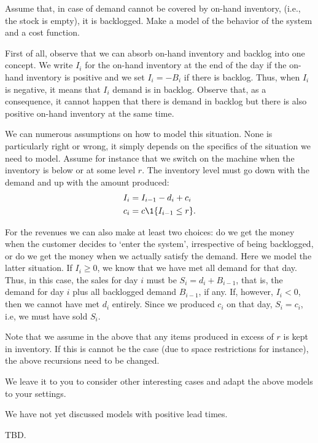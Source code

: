 \begin{question}
  Assume that, in case of demand cannot be covered by on-hand
  inventory, (i.e., the stock is empty), it is backlogged. Make a
  model of the behavior of the system and a cost function.
  \begin{solution}
    First of all, observe that we can absorb on-hand inventory and
    backlog into one concept. We write $I_i$ for the on-hand inventory
    at the end of the day if the on-hand inventory is positive and we
    set $I_i=-B_i$ if there is backlog. Thus, when $I_i$ is negative,
    it means that $I_i$ demand is in backlog.  Observe that, as a
    consequence, it cannot happen that there is demand in backlog but
    there is also positive on-hand inventory at the same time.

    We can numerous assumptions on how to model this situation. None
    is particularly right or wrong, it simply depends on the specifics
    of the situation we need to model. Assume for instance that we
    switch on the machine when the inventory is below or at some level
    $r$. The inventory level must go down with the demand and up with
    the amount produced:
    \begin{align*}
      I_i &= I_{i-1}-d_i + c_i \\
c_i &= c \1{I_{i-1} \leq r}.
    \end{align*}

    For the revenues we can also make at least two choices: do we get
    the money when the customer decides to `enter the system',
    irrespective of being backlogged, or do we get the money when we
    actually satisfy the demand. Here we model the latter situation.
    If $I_i\geq 0$, we know that we have met all demand for that
    day. Thus, in this case, the sales for day $i$ must be
    $S_i = d_i+B_{i-1}$, that is, the demand for day $i$ plus all
    backlogged demand $B_{i-1}$, if any. If, however, $I_i <0$, then
    we cannot have met $d_i$ entirely. Since we produced $c_i$ on that
    day, $S_i = c_i$, i.e, we must have sold $S_i$. 

    Note that we assume in the above that any items produced in excess
    of $r$ is kept in inventory. If this is cannot be the case (due to
    space restrictions for instance), the above recursions need to be
    changed.

    We leave it to you to consider other interesting cases and adapt
    the above models to your settings.

  \end{solution}
\end{question}


\begin{question}
  We have not yet discussed models with positive lead times. 
  \begin{solution}
    TBD.
  \end{solution}
\end{question}


